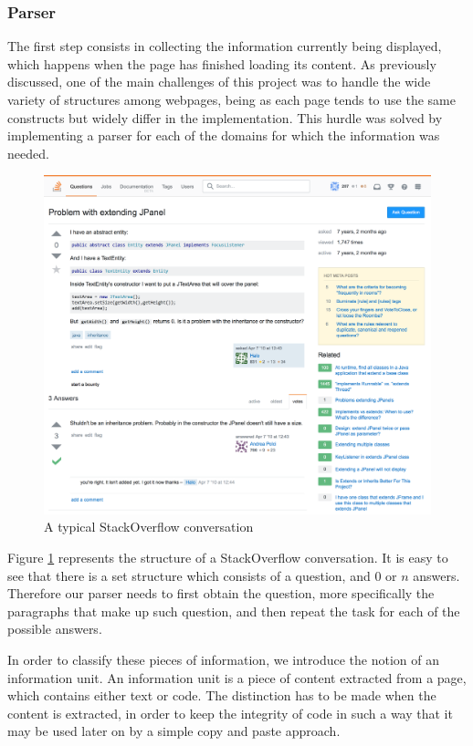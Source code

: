 \subsubsection{Parser}
The first step consists in collecting the information currently being displayed, which happens when the page has finished loading its content. As previously discussed, one of the main challenges of this project was to handle the wide variety of structures among webpages, being as each page tends to use the same constructs but widely differ in the implementation. This hurdle was solved by implementing a parser for each of the domains for which the information was needed. 

\begin{figure}[H]
\centering
\includegraphics[scale=0.3]{Figures/SOConv}
\caption{A typical StackOverflow conversation}
\label{fig:soConv}
\end{figure}

Figure \ref{fig:soConv} represents the structure of a StackOverflow conversation. It is easy to see that there is a set structure which consists of a question, and $0$ or $n$ answers. Therefore our parser needs to first obtain the question, more specifically the paragraphs that make up such question, and then repeat the task for each of the possible answers. 

In order to classify these pieces of information, we introduce the notion of an information unit. An information unit is a piece of content extracted from a page, which contains either text or code. The distinction has to be made when the content is extracted, in order to keep the integrity of code in such a way that it may be used later on by a simple copy and paste approach. 

